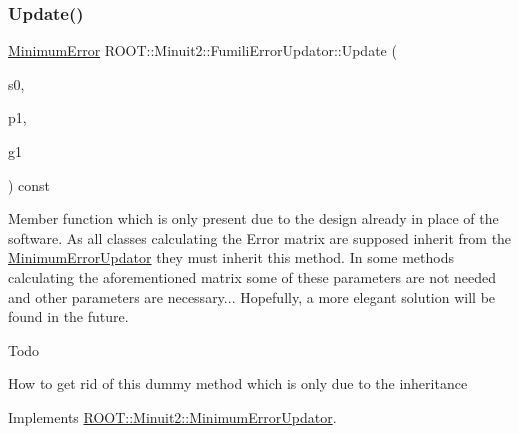\subsubsection{\texorpdfstring{Update()}{Update()}\hspace{0.1cm}{\footnotesize\ttfamily [5/6]}}
{\footnotesize\ttfamily \mbox{\hyperlink{classROOT_1_1Minuit2_1_1MinimumError}{Minimum\+Error}} R\+O\+O\+T\+::\+Minuit2\+::\+Fumili\+Error\+Updator\+::\+Update (\begin{DoxyParamCaption}\item[{const \mbox{\hyperlink{classROOT_1_1Minuit2_1_1MinimumState}{Minimum\+State}} \&}]{s0,  }\item[{const \mbox{\hyperlink{classROOT_1_1Minuit2_1_1MinimumParameters}{Minimum\+Parameters}} \&}]{p1,  }\item[{const \mbox{\hyperlink{classROOT_1_1Minuit2_1_1FunctionGradient}{Function\+Gradient}} \&}]{g1 }\end{DoxyParamCaption}) const\hspace{0.3cm}{\ttfamily [virtual]}}

Member function which is only present due to the design already in place of the software. As all classes calculating the Error matrix are supposed inherit from the \mbox{\hyperlink{classROOT_1_1Minuit2_1_1MinimumErrorUpdator}{Minimum\+Error\+Updator}} they must inherit this method. In some methods calculating the aforementioned matrix some of these parameters are not needed and other parameters are necessary... Hopefully, a more elegant solution will be found in the future.

\begin{DoxyRefDesc}{Todo}
\item[\mbox{\hyperlink{todo__todo000007}{Todo}}]How to get rid of this dummy method which is only due to the inheritance\end{DoxyRefDesc}


Implements \mbox{\hyperlink{classROOT_1_1Minuit2_1_1MinimumErrorUpdator_ae75c33152c49ebf34e6119adc0bbbda9}{R\+O\+O\+T\+::\+Minuit2\+::\+Minimum\+Error\+Updator}}.


